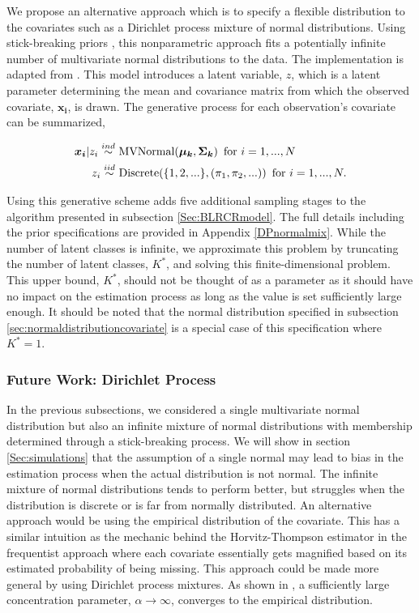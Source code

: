 \documentclass[
  12pt,
]{article}
\begin{document}
We propose an alternative approach which is to specify a flexible
distribution to the covariates such as a Dirichlet process mixture of
normal distributions. Using stick-breaking priors
\citep{ishwaran_gibbs_2001}, this nonparametric approach fits a
potentially infinite number of multivariate normal distributions to the
data. The implementation is adapted from \cite{gelman_bayesian_2014}.
This model introduces a latent variable, \(z\), which is a latent
parameter determining the mean and covariance matrix from which the
observed covariate, \(\boldsymbol{x_i}\), is drawn. The generative
process for each observation's covariate can be summarized,

\begin{align}
\boldsymbol{x_i}|z_i \stackrel{ind}{\sim} & \text{ MVNormal}(\boldsymbol{\mu_k},\boldsymbol{\Sigma_k}) \hspace{5px} \text{for } i=1,...,N\\
z_i \stackrel{iid}{\sim} & \text{ Discrete}(\{1,2,...\},(\pi_1,\pi_2,...)) \hspace{5px} \text{for } i=1,...,N.
\end{align}

Using this generative scheme adds five additional sampling stages to the
algorithm presented in subsection \ref{Sec:BLRCRmodel}. The full details
including the prior specifications are provided in Appendix
\ref{DPnormalmix}. While the number of latent classes is infinite, we
approximate this problem by truncating the number of latent classes,
\(K^*\), and solving this finite-dimensional problem. This upper bound,
\(K^*\), should not be thought of as a parameter as it should have no
impact on the estimation process as long as the value is set
sufficiently large enough. It should be noted that the normal
distribution specified in subsection
\ref{sec:normaldistributioncovariate} is a special case of this
specification where \(K^*=1\).

\subsubsection{Future Work: Dirichlet Process}

In the previous subsections, we considered a single multivariate normal
distribution but also an infinite mixture of normal distributions with
membership determined through a stick-breaking process. We will show in
section \ref{Sec:simulations} that the assumption of a single normal may
lead to bias in the estimation process when the actual distribution is
not normal. The infinite mixture of normal distributions tends to
perform better, but struggles when the distribution is discrete or is
far from normally distributed. An alternative approach would be using
the empirical distribution of the covariate. This has a similar
intuition as the mechanic behind the Horvitz-Thompson estimator in the
frequentist approach where each covariate essentially gets magnified
based on its estimated probability of being missing. This approach could
be made more general by using Dirichlet process mixtures. As shown in
\cite{gelman_bayesian_2014}, a sufficiently large concentration
parameter, \(\alpha \rightarrow \infty\), converges to the empirical
distribution.
\end{document}
